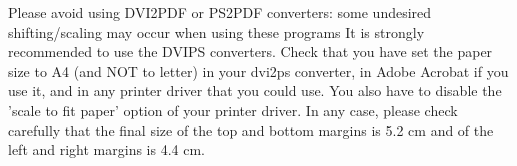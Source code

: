 Please avoid using DVI2PDF or PS2PDF converters: some undesired
shifting/scaling may occur when using these programs
It is strongly recommended to use the DVIPS converters. 
%
Check that you have set the paper size to A4 (and NOT to letter) in your
dvi2ps converter, in Adobe Acrobat if you use it, and in any printer driver
that you could use.  You also have to disable the 'scale to fit paper' option
of your printer driver.
%
In any case, please check carefully that the final size of the top and
bottom margins is 5.2 cm and of the left and right margins is 4.4 cm.
